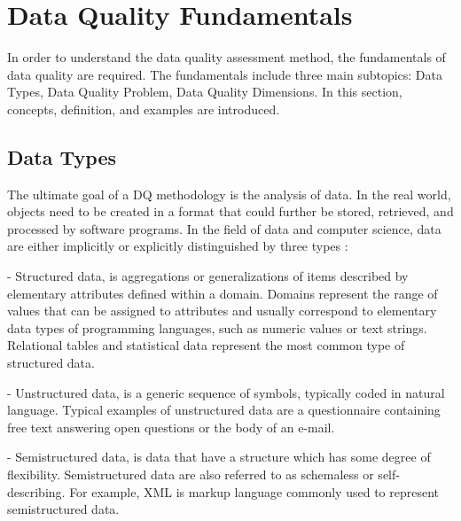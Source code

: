 \documentclass[pdftex,english,oribibl]{llncs}
\begin{document}
\section{Data Quality Fundamentals}
In order to understand the data quality assessment method, the fundamentals of data quality are required. The fundamentals include three main subtopics: Data Types, Data Quality Problem, Data Quality Dimensions.  In this section, concepts, definition, and examples are
introduced.

\subsection{Data Types}\label{sec:DataTypes}

The ultimate goal of a DQ methodology is the analysis of data.
In the real world, objects need to be created in a format that could further be stored, retrieved, and processed by software programs.
In the field of data and computer science, data are either implicitly or explicitly distinguished by three types \cite{Batini2009MethodologiesForDataQuality}:

- Structured data, is aggregations or generalizations of items described by elementary attributes defined within a domain.
Domains represent the range of values that can be assigned to attributes and usually correspond to elementary data types of programming languages, such as numeric values or text strings.
Relational tables and statistical data represent the most common type of structured data.

- Unstructured data, is a generic sequence of symbols, typically coded in natural language.
Typical examples of unstructured data are a questionnaire containing free text answering open questions or the body of an e-mail.

- Semistructured data, is data that have a structure which has some degree of flexibility. Semistructured data are also referred to as schemaless or self-describing. For example, XML is markup language commonly used to represent semistructured data.
\begin{comment}
Some common characteristics are:
(1) data can contain fields not known at design time; for instance, an XML file does not have an associated XML schema file;
(2) the same kind of data may be represented in multiple ways; for example, a date might be represented by one field or by multiple fields, even within a single data set; and
(3) among the fields known at design time, many fields will not have values.
\end{comment}
\end{document}
